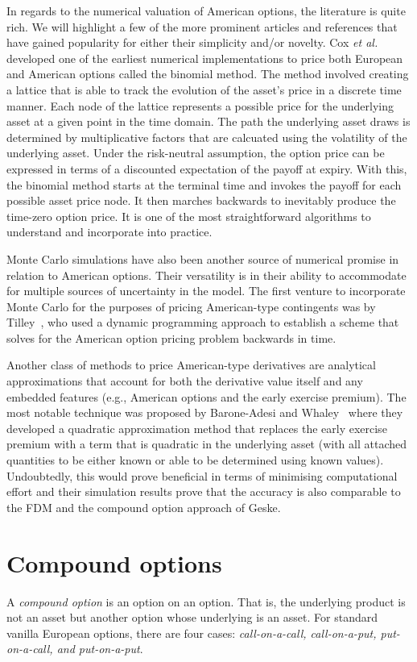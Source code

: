 In regards to the numerical valuation of American options, the literature is quite rich. We will highlight a few of the more prominent articles and references that have gained popularity for either their simplicity and/or novelty. Cox \emph{et al.}~\cite{Cox1979} developed one of the earliest numerical implementations to price both European and American options called the binomial method. The method involved creating a lattice that is able to track the evolution of the asset's price in a discrete time manner. Each node of the lattice represents a possible price for the underlying asset at a given point in the time domain. The path the underlying asset draws is determined by multiplicative factors that are calcuated using the volatility of the underlying asset. Under the risk-neutral assumption, the option price can be expressed in terms of a discounted expectation of the payoff at expiry. With this, the binomial method starts at the terminal time and invokes the payoff for each possible asset price node. It then marches backwards to inevitably produce the time-zero option price. It is one of the most straightforward algorithms to understand and incorporate into practice.

Monte Carlo simulations have also been another source of numerical promise in relation to American options. Their versatility is in their ability to accommodate for multiple sources of uncertainty in the model. The first venture to incorporate Monte Carlo for the purposes of pricing American-type contingents was by Tilley~\cite{Tilley1993}, who used a dynamic programming approach to establish a scheme that solves for the American option pricing problem backwards in time.

Another class of methods to price American-type derivatives are analytical approximations that account for both the derivative value itself and any embedded features (e.g., American options and the early exercise premium). The most notable technique was proposed by Barone-Adesi and Whaley~\cite{Barone1987} where they developed a quadratic approximation method that replaces the early exercise premium with a term that is quadratic in the underlying asset (with all attached quantities to be either known or able to be determined using known values). Undoubtedly, this would prove beneficial in terms of minimising computational effort and their simulation results prove that the accuracy is also comparable to the FDM and the compound option approach of Geske. 
	
\section{Compound options}
	A \emph{compound option} is an option on an option. That is, the underlying product is not an asset but another option whose underlying is an asset. For standard vanilla European options, there are four cases: \emph{call-on-a-call, call-on-a-put, put-on-a-call, and put-on-a-put}.


